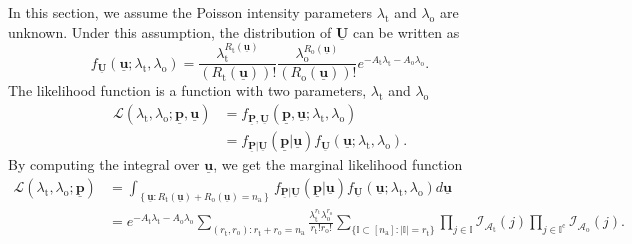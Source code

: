 In this section, we assume the Poisson intensity parameters $\lambda_{\mathrm{t}}$ and $\lambda_{\mathrm{o}}$ are unknown.
Under this assumption, the distribution of $\underline{\mathbf{U}}$ can be written as
\begin{equation}
f_{\underline{\mathbf{U}}} \left( \underline{\mathbf{u}};
\lambda_{\mathrm{t}}, \lambda_{\mathrm{o}} \right)
= \frac{ \lambda_{\mathrm{t}}^{R_{\mathrm{t}}(\underline{\mathbf{u}})} }
{ ( R_{\mathrm{t}}(\underline{\mathbf{u}}) )! }
\frac{ \lambda_{\mathrm{o}}^{R_{\mathrm{o}}(\underline{\mathbf{u}})} }
{ ( R_{\mathrm{o}}(\underline{\mathbf{u}}) )! }
e^{- A_{\mathrm{t}} \lambda_{\mathrm{t}}
	- A_{\mathrm{o}} \lambda_{\mathrm{o}}} .
\end{equation}
The likelihood function is a function with two parameters, $\lambda_{\mathrm{t}}$ and $\lambda_{\mathrm{o}}$
\begin{equation}
\begin{split}
\mathcal{L} \left( \lambda_{\mathrm{t}}, \lambda_{\mathrm{o}};
\underline{\mathbf{p}}, \underline{\mathbf{u}} \right)
&= f_{\underline{\mathbf{P}}, \underline{\mathbf{U}}}
\left( \underline{\mathbf{p}}, \underline{\mathbf{u}};
\lambda_{\mathrm{t}}, \lambda_{\mathrm{o}} \right) \\
&= f_{\underline{\mathbf{P}} | \underline{\mathbf{U}}}
\left( \underline{\mathbf{p}} | \underline{\mathbf{u}} \right)
f_{\underline{\mathbf{U}}} \left( \underline{\mathbf{u}};
\lambda_{\mathrm{t}}, \lambda_{\mathrm{o}} \right) .
\end{split}
\end{equation}
By computing the integral over $\underline{\mathbf{u}}$, we get the marginal likelihood function
\begin{equation} \label{equation:Likelihood}
\begin{split}
\mathcal{L} \left( \lambda_{\mathrm{t}}, \lambda_{\mathrm{o}};
\underline{\mathbf{p}} \right)
&= \int_{ \left\{ \underline{\mathbf{u}}
	: R_{\mathrm{t}}(\underline{\mathbf{u}}) +
	R_{\mathrm{o}}(\underline{\mathbf{u}}) = n_{\mathrm{a}} \right\} }
f_{\underline{\mathbf{P}} | \underline{\mathbf{U}}}
\left( \underline{\mathbf{p}} | \underline{\mathbf{u}} \right)
f_{\underline{\mathbf{U}}} \left( \underline{\mathbf{u}};
\lambda_{\mathrm{t}}, \lambda_{\mathrm{o}} \right) d\underline{\mathbf{u}} \\
&= e^{- A_{\mathrm{t}} \lambda_{\mathrm{t}}
	- A_{\mathrm{o}} \lambda_{\mathrm{o}}}
\sum_{(r_{\mathrm{t}}, r_{\mathrm{o}}) :
	r_{\mathrm{t}} + r_{\mathrm{o}} = n_{\mathrm{a}}}
\frac{\lambda_{\mathrm{t}}^{r_{\mathrm{t}}}
	\lambda_{\mathrm{o}}^{r_{\mathrm{o}}}}
{r_{\mathrm{t}}! r_{\mathrm{o}}!}
\sum_{\{ \mathbb{I} \subset [n_{\mathrm{a}}]
	: |\mathbb{I}| = r_{\mathrm{t}} \}}
\prod_{j \in \mathbb{I}}
\mathcal{I}_{\mathcal{A}_{\mathrm{t}}}(j)
\prod_{j \in \mathbb{I}^{\mathrm{c}}}
\mathcal{I}_{\mathcal{A}_{\mathrm{o}}}(j) .
\end{split}
\end{equation}
